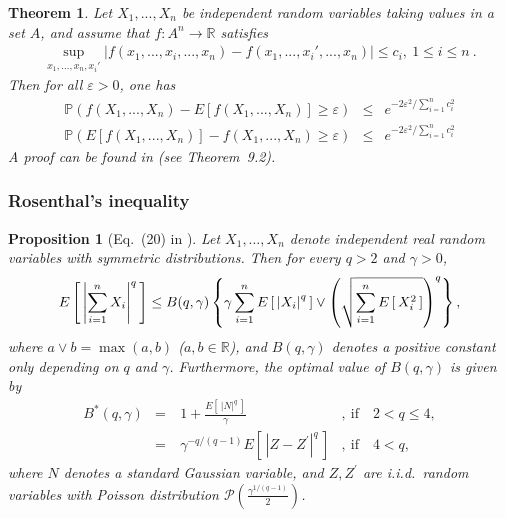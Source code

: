 \documentclass[twoside,11pt]{article}
\numberwithin{equation}{section}
\newtheorem{prop}{Proposition}[section]
\newcommand{\prob}[1]{\mathbb{P}\left(#1 \right)}
\newcommand{\gc}[1]{\left[#1\right]}
\newcommand{\1}{\mathds{1}}%
\newcommand{\paren}[1]{\left( #1 \right)}
\newcommand{\croch}[1]{\left[\, #1 \,\right]}
\newcommand{\acc}[1]{\left\{ #1 \right\}}
\newcommand{\abs}[1]{\left\lvert #1 \right\rvert} %
\newcommand{\iid}{\textit{i.i.d.}\ }
\newcommand{\R}{\mathbb{R}}
\numberwithin{equation}{section}
\theoremstyle{plain}
\newtheorem{thm}{Theorem}[section]
\begin{document}
\begin{thm}\label{thm.bounded.differences.ineq}
Let $X_1,...,X_n$ be independent random variables taking values in a set $A$, and assume that $f: A^n \rightarrow \mathbb{R}$ satisfies
\begin{eqnarray*}
\underset{x_1,...,x_n,x_i'}{\sup}\left|f(x_1,...,x_i,...,x_n) - f(x_1,...,x_i',...,x_n) \right| \leq c_i, \ 1\leq i \leq n \ .
\end{eqnarray*}
Then for all $\varepsilon>0$, one has
\begin{eqnarray*}
\prob{f(X_1,...,X_n) - E\gc{f(X_1,...,X_n)} \geq \varepsilon} &\leq& e^{-2\varepsilon^2/\sum_{i=1}^{n}c_i^2} \\
\prob{E\gc{f(X_1,...,X_n)} - f(X_1,...,X_n) \geq \varepsilon} &\leq& e^{-2\varepsilon^2/\sum_{i=1}^{n}c_i^2}
\end{eqnarray*}
A proof can be found in \cite{DeGyLu_1996} (see Theorem~9.2).
\end{thm}







\subsubsection{Rosenthal's inequality}

\begin{prop}[Eq.~(20) in \cite{IbragShar2002}]
%
\label{prop.rosenthal.inequality}
%
Let $X_1,\ldots,X_n$ denote independent real random variables with symmetric distributions.
%
Then for every $q>2$ and $\gamma>0$,
\begin{align*}
  E\croch{ \abs{\sum_{i=1}^n X_i}^q } \leq B(q,\gamma) \acc{ \gamma \sum_{i=1}^n E\croch{\abs{X_i}^q} \vee \paren{ \sqrt{ \sum_{i=1}^n E\croch{X_i^2} } }^q  } , \hfill
\end{align*}
where $a\vee b = \max(a,b)$ ($a,b\in \R$), and $B(q,\gamma)$ denotes a positive constant only depending on $q$ and $\gamma$.
%
Furthermore, the optimal value of $B(q,\gamma)$ is given by
$$\begin{array}{rcll}
  B^*(q,\gamma)  & = &\ 1+ \frac{E\croch{\abs{ N}^q} }{\gamma}&,\ \mbox{if}\quad 2< q \leq 4, \\
& = &\ \gamma^{-q/(q-1)} E\croch{ \abs{ Z - Z^\prime }^q } &,\ \mbox{if}\quad 4< q,
\end{array}
$$
where $N$ denotes a standard Gaussian variable, and $Z,Z^\prime$ are \iid random variables with Poisson distribution $\mathcal{P}\paren{ \frac{\gamma^{1/(q-1)}}{2} }$.

\end{prop}
\end{document}
